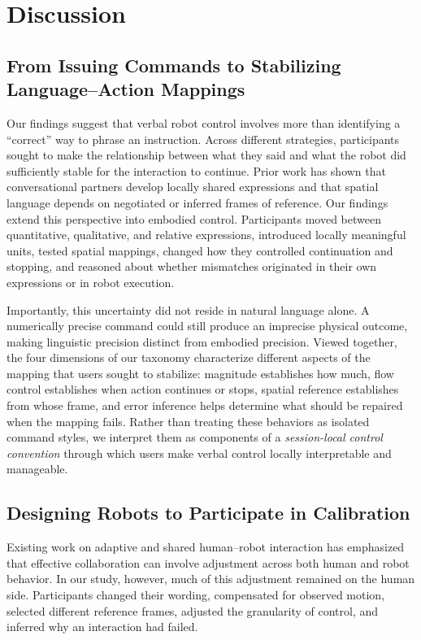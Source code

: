 
\section{Discussion}

\subsection{From Issuing Commands to Stabilizing Language--Action Mappings}

Our findings suggest that verbal robot control involves more than identifying a ``correct'' way to phrase an instruction. Across different strategies, participants sought to make the relationship between what they said and what the robot did sufficiently stable for the interaction to continue. Prior work has shown that conversational partners develop locally shared expressions and that spatial language depends on negotiated or inferred frames of reference. \citep{brennan1996pacts, li2016spatial} Our findings extend this perspective into embodied control. Participants moved between quantitative, qualitative, and relative expressions, introduced locally meaningful units, tested spatial mappings, changed how they controlled continuation and stopping, and reasoned about whether mismatches originated in their own expressions or in robot execution.

Importantly, this uncertainty did not reside in natural language alone. A numerically precise command could still produce an imprecise physical outcome, making linguistic precision distinct from embodied precision. Viewed together, the four dimensions of our taxonomy characterize different aspects of the mapping that users sought to stabilize: magnitude establishes how much, flow control establishes when action continues or stops, spatial reference establishes from whose frame, and error inference helps determine what should be repaired when the mapping fails. Rather than treating these behaviors as isolated command styles, we interpret them as components of a \textit{session-local control convention} through which users make verbal control locally interpretable and manageable.

\subsection{Designing Robots to Participate in Calibration}

Existing work on adaptive and shared human--robot interaction has emphasized that effective collaboration can involve adjustment across both human and robot behavior. \citep{nikolaidis2017mutual, cui2023lilac} In our study, however, much of this adjustment remained on the human side. Participants changed their wording, compensated for observed motion, selected different reference frames, adjusted the granularity of control, and inferred why an interaction had failed.

